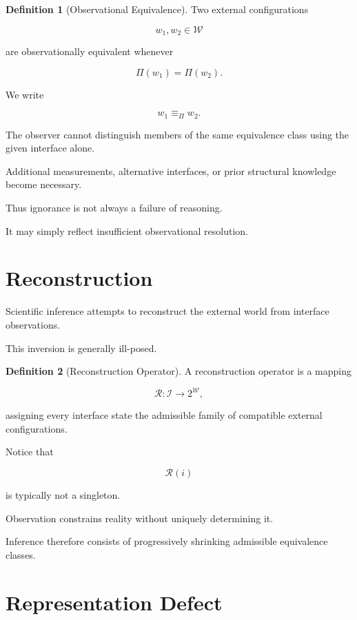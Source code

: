 \documentclass[11pt,oneside]{book}
\numberwithin{equation}{chapter}
\theoremstyle{definition}
\newtheorem{definition}{Definition}[chapter]
\theoremstyle{plain}
\begin{document}
\begin{definition}[Observational Equivalence]

Two external configurations

\[
w_1,w_2
\in
\mathcal{W}
\]

are observationally equivalent whenever

\[
\Pi(w_1)
=
\Pi(w_2).
\]

We write

\[
w_1
\equiv_{\Pi}
w_2.
\]

\end{definition}

The observer cannot distinguish members of the same equivalence class using
the given interface alone.

Additional measurements, alternative interfaces, or prior structural
knowledge become necessary.

Thus ignorance is not always a failure of reasoning.

It may simply reflect insufficient observational resolution.

\section{Reconstruction}

Scientific inference attempts to reconstruct the external world from
interface observations.

This inversion is generally ill-posed.

\begin{definition}[Reconstruction Operator]

A reconstruction operator is a mapping

\[
\mathcal{R}:
\mathcal{I}
\rightarrow
2^{\mathcal{W}},
\]

assigning every interface state the admissible family of compatible external
configurations.

\end{definition}

Notice that

\[
\mathcal{R}(i)
\]

is typically not a singleton.

Observation constrains reality without uniquely determining it.

Inference therefore consists of progressively shrinking admissible
equivalence classes.

\section{Representation Defect}
\end{document}
